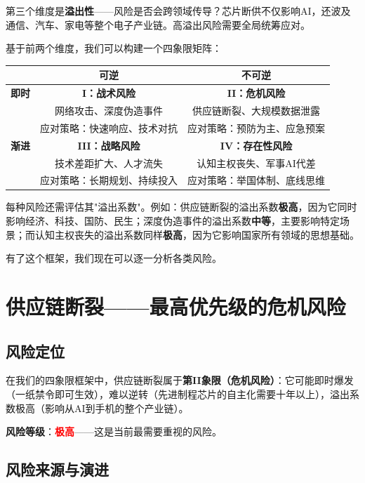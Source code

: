 第三个维度是\textbf{溢出性}——风险是否会跨领域传导？芯片断供不仅影响AI，还波及通信、汽车、家电等整个电子产业链。高溢出风险需要全局统筹应对。

基于前两个维度，我们可以构建一个四象限矩阵：

\begin{center}
\small
\begin{tabular}{|c|c|c|}
\hline
& \textbf{可逆} & \textbf{不可逆} \\
\hline
\textbf{即时} & \textbf{I：战术风险} & \textbf{II：危机风险} \\
& 网络攻击、深度伪造事件 & 供应链断裂、大规模数据泄露 \\
& 应对策略：快速响应、技术对抗 & 应对策略：预防为主、应急预案 \\
\hline
\textbf{渐进} & \textbf{III：战略风险} & \textbf{IV：存在性风险} \\
& 技术差距扩大、人才流失 & 认知主权丧失、军事AI代差 \\
& 应对策略：长期规划、持续投入 & 应对策略：举国体制、底线思维 \\
\hline
\end{tabular}
\end{center}

每种风险还需评估其"溢出系数"。例如：供应链断裂的溢出系数\textbf{极高}，因为它同时影响经济、科技、国防、民生；深度伪造事件的溢出系数\textbf{中等}，主要影响特定场景；而认知主权丧失的溢出系数同样\textbf{极高}，因为它影响国家所有领域的思想基础。

有了这个框架，我们现在可以逐一分析各类风险。

\section{供应链断裂——最高优先级的危机风险}

\subsection{风险定位}

在我们的四象限框架中，供应链断裂属于\textbf{第II象限（危机风险）}：它可能即时爆发（一纸禁令即可生效），难以逆转（先进制程芯片的自主化需要十年以上），溢出系数极高（影响从AI到手机的整个产业链）。

\textbf{风险等级}：\textcolor{red}{\textbf{极高}}——这是当前最需要重视的风险。

\subsection{风险来源与演进}

